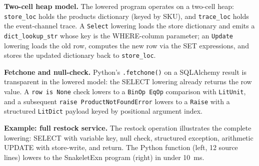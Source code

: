 \documentclass[11pt,a4paper]{article}
\begin{document}
\textbf{Two-cell heap model.}  The lowered program operates on a
two-cell heap: \texttt{store\_loc} holds the products dictionary
(keyed by SKU), and \texttt{trace\_loc} holds the event-channel trace.
A \texttt{Select} lowering loads the store dictionary and emits a
\texttt{dict\_lookup\_str} whose key is the WHERE-column parameter;
an \texttt{Update} lowering loads the old row, computes the new row
via the SET expressions, and stores the updated dictionary back to
\texttt{store\_loc}.

\textbf{Fetchone and null-check.}  Python's \texttt{.fetchone()} on a
SQLAlchemy result is transparent in the lowered model: the SELECT
lowering already returns the row value.  A \texttt{row is None} check
lowers to a \texttt{BinOp EqOp} comparison with \texttt{LitUnit}, and a
subsequent \texttt{raise ProductNotFoundError} lowers to a
\texttt{Raise} with a structured \texttt{LitDict} payload keyed by
positional argument index.

\textbf{Example: full restock service.}  The restock operation
illustrates the complete lowering: SELECT with variable key, null
check, structured exception, arithmetic UPDATE with store-write, and
return.  The Python function (left, 12 source lines) lowers to the
SnakeletExn program (right) in under 10~ms.
\end{document}
